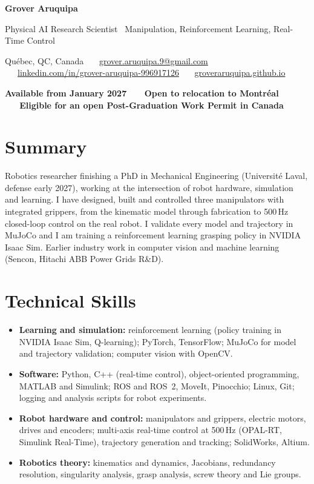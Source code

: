 \documentclass[10pt,letterpaper]{article}
\begin{document}
{\LARGE\bfseries Grover Aruquipa}\par\vspace{2pt}
{\large Physical AI Research Scientist \textbar\ Manipulation, Reinforcement Learning, Real-Time Control}\par\vspace{3pt}
{\small Qu\'ebec, QC, Canada \ \textbullet\ \
\href{mailto:grover.aruquipa.9@gmail.com}{grover.aruquipa.9@gmail.com} \ \textbullet\ \
\href{https://www.linkedin.com/in/grover-aruquipa-996917126}{linkedin.com/in/grover-aruquipa-996917126} \ \textbullet\ \
\href{https://groveraruquipa.github.io}{groveraruquipa.github.io}}\par\vspace{1pt}
{\small\bfseries Available from January 2027 \ \textbullet\ \ Open to relocation to Montr\'eal \ \textbullet\ \ Eligible for an open Post-Graduation Work Permit in Canada}\par

\section{Summary}
Robotics researcher finishing a PhD in Mechanical Engineering (Universit\'e Laval, defense early 2027), working at the
intersection of robot hardware, simulation and learning. I have designed, built and controlled three manipulators with
integrated grippers, from the kinematic model through fabrication to 500\,Hz closed-loop control on the real robot. I
validate every model and trajectory in MuJoCo and I am training a reinforcement learning grasping policy in NVIDIA Isaac Sim.
Earlier industry work in computer vision and machine learning (Sencon, Hitachi ABB Power Grids R\&D).

\section{Technical Skills}
\begin{itemize}
\item \textbf{Learning and simulation:} reinforcement learning (policy training in NVIDIA Isaac Sim, Q-learning);
PyTorch, TensorFlow; MuJoCo for model and trajectory validation; computer vision with OpenCV.
\item \textbf{Software:} Python, C++ (real-time control), object-oriented programming, MATLAB and Simulink; ROS and ROS~2,
MoveIt, Pinocchio; Linux, Git; logging and analysis scripts for robot experiments.
\item \textbf{Robot hardware and control:} manipulators and grippers, electric motors, drives and encoders; multi-axis
real-time control at 500\,Hz (OPAL-RT, Simulink Real-Time), trajectory generation and tracking; SolidWorks, Altium.
\item \textbf{Robotics theory:} kinematics and dynamics, Jacobians, redundancy resolution, singularity analysis, grasp
analysis, screw theory and Lie groups.
\end{itemize}
\end{document}
